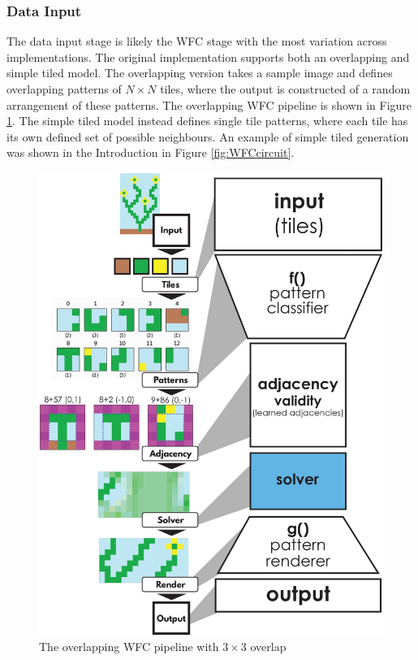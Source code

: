 \subsubsection{Data Input}
The data input stage is likely the WFC stage with the most variation across implementations. The original implementation \cite{Gumin_Wave_Function_Collapse_2016} supports both an overlapping and simple tiled model. The overlapping version takes a sample image and defines overlapping patterns of \(N\times N\) tiles, where the output is constructed of a random arrangement of these patterns. The overlapping WFC pipeline is shown in Figure \ref{fig:overlappingWFC}. The simple tiled model instead defines single tile patterns, where each tile has its own defined set of possible neighbours. An example of simple tiled generation was shown in the Introduction in Figure \ref{fig:WFCcircuit}.

\begin{figure}[H]
        \centering
        \includegraphics[width=\textwidth, height=0.5\textheight, keepaspectratio]{Images/OverlappingWFC.jpg}
        \caption{The overlapping WFC pipeline with \(3\times 3\) overlap \cite{WFC_ConstraintSolving_and_ML}}
        \label{fig:overlappingWFC}
\end{figure}

